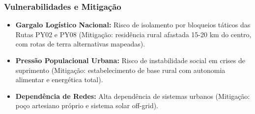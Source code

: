 \subsubsection{Vulnerabilidades e
Mitigação}

\begin{itemize}
\tightlist
\item
  \textbf{Gargalo Logístico Nacional:} Risco de isolamento por bloqueios
  táticos das Rutas PY02 e PY08 (Mitigação: residência rural afastada
  15-20 km do centro, com rotas de terra alternativas mapeadas).
\item
  \textbf{Pressão Populacional Urbana:} Risco de instabilidade social em
  crises de suprimento (Mitigação: estabelecimento de base rural com
  autonomia alimentar e energética total).
\item
  \textbf{Dependência de Redes:} Alta dependência de sistemas urbanos
  (Mitigação: poço artesiano próprio e sistema solar off-grid).
\end{itemize}

